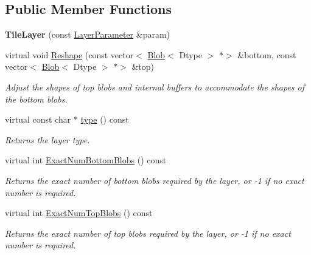 \subsection*{Public Member Functions}
\begin{DoxyCompactItemize}
\item 
\mbox{\label{classcaffe_1_1_tile_layer_a7c6cb911e56abaf3dc43c38b8dc0e94e}} 
{\bfseries Tile\+Layer} (const \mbox{\hyperlink{classcaffe_1_1_layer_parameter}{Layer\+Parameter}} \&param)
\item 
virtual void \mbox{\hyperlink{classcaffe_1_1_tile_layer_a593f5b8342f1b092633d2a1f7e4a6843}{Reshape}} (const vector$<$ \mbox{\hyperlink{classcaffe_1_1_blob}{Blob}}$<$ Dtype $>$ $\ast$$>$ \&bottom, const vector$<$ \mbox{\hyperlink{classcaffe_1_1_blob}{Blob}}$<$ Dtype $>$ $\ast$$>$ \&top)
\begin{DoxyCompactList}\small\item\em Adjust the shapes of top blobs and internal buffers to accommodate the shapes of the bottom blobs. \end{DoxyCompactList}\item 
\mbox{\label{classcaffe_1_1_tile_layer_a1ef109677c3dd7fb9963a69c633585e8}} 
virtual const char $\ast$ \mbox{\hyperlink{classcaffe_1_1_tile_layer_a1ef109677c3dd7fb9963a69c633585e8}{type}} () const
\begin{DoxyCompactList}\small\item\em Returns the layer type. \end{DoxyCompactList}\item 
virtual int \mbox{\hyperlink{classcaffe_1_1_tile_layer_ac7e0da0e543f134e04b00d8625132b71}{Exact\+Num\+Bottom\+Blobs}} () const
\begin{DoxyCompactList}\small\item\em Returns the exact number of bottom blobs required by the layer, or -\/1 if no exact number is required. \end{DoxyCompactList}\item 
virtual int \mbox{\hyperlink{classcaffe_1_1_tile_layer_a1040cc3b4fb028d54f67a685513d745b}{Exact\+Num\+Top\+Blobs}} () const
\begin{DoxyCompactList}\small\item\em Returns the exact number of top blobs required by the layer, or -\/1 if no exact number is required. \end{DoxyCompactList}\item 

\end{DoxyCompactItemize}
